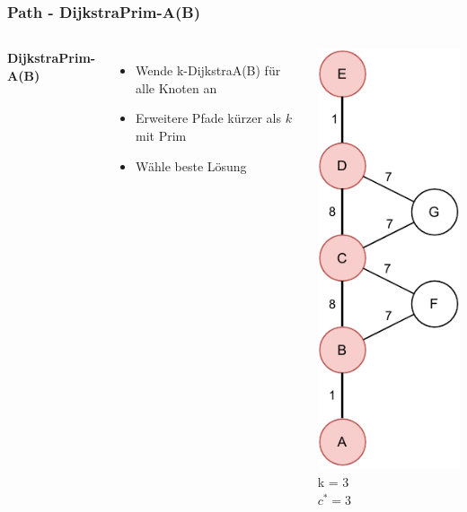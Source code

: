 \documentclass[aspectratio=169]{beamer}
\begin{document}


\begin{frame}
	\frametitle{Path - DijkstraPrim-A(B)}
	\begin{columns}[c] %
		
		\textbf{DijkstraPrim-A(B)}
		\begin{itemize}
			\item Wende k-DijkstraA(B) für alle Knoten an
			\item Erweitere Pfade kürzer als $k$ mit Prim
			\item Wähle beste Lösung
		\end{itemize}
		\includegraphics[scale=.5]{path_optimal.pdf}
		k = 3\\
		$c^* = 3$
		
		
	\end{columns}
	\end{frame}
	
\end{document}
